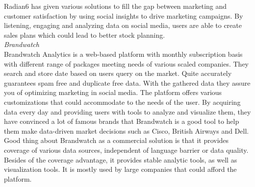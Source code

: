 Radian6 has given various solutions to fill the gap between marketing and customer satisfaction by using social insights to drive marketing campaigns. By listening, engaging and analyzing data on social media, users are able to create sales plans which could lead to better stock planning.\\
\textit{Brandwatch\\}
Brandwatch Analytics is a web-based platform with monthly subscription basis with different range of packages meeting needs of various scaled companies. They search and store date based on users query on the market. Quite accurately guarantees spam free and duplicate free data. With the gathered data they assure you of optimizing marketing in social media. The platform offers various customizations that could accommodate to the needs of the user. By acquiring data every day and providing users with tools to analyze and visualize them, they have convinced a lot of famous brands that Brandwatch is a good tool to help them make data-driven market decisions such as Cisco, British Airways and Dell. 
Good thing about Brandwatch as a commercial solution is that it provides coverage of various data sources, independent of language barrier or data quality. Besides of the coverage advantage, it provides stable analytic tools, as well as visualization tools.  It is mostly used by large companies that could afford the platform.\\
